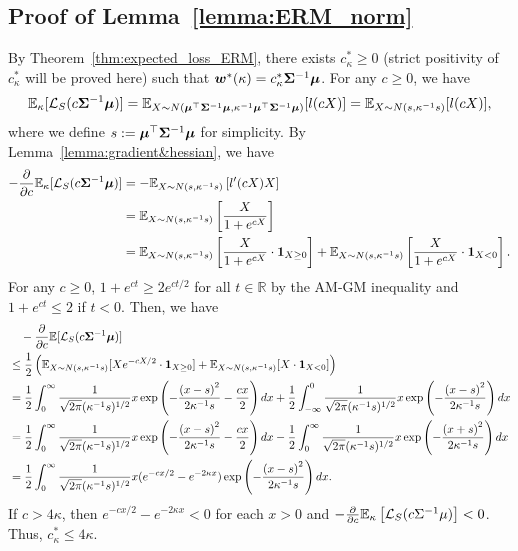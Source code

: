 \subsection{Proof of Lemma~\ref{lemma:ERM_norm}}\label{proof:lemma:ERM_norm}
By Theorem~\ref{thm:expected_loss_ERM}, there exists $c_\kappa^*\geq 0$ (strict positivity of $c_\kappa^*$ will be proved here) such that ${\bm{w}}^*(\kappa)= c_\kappa^* {\bm{\Sigma}}^{-1}{\bm{\mu}}$. For any $c\geq 0$, we have
\begin{equation*}
\mathbb{E}_\kappa[\mathcal{L}_S(c{\bm{\Sigma}}^{-1}{\bm{\mu}})] = \mathbb{E}_{X \sim N \left({\bm{\mu}}^\top {\bm{\Sigma}}^{-1} {\bm{\mu}}, \kappa^{-1} {\bm{\mu}}^\top {\bm{\Sigma}}^{-1} {\bm{\mu}} \right)}[l(c X)] = \mathbb{E}_{X \sim N \left(s, \kappa^{-1} s\right)}[l(c X)],
\end{equation*}
where we define $s:= {\bm{\mu}}^\top {\bm{\Sigma}}^{-1} {\bm{\mu}}$ for simplicity. By Lemma~\ref{lemma:gradient&hessian}, we have
\begin{align*}
    -\frac{\partial}{\partial c} \mathbb{E}_\kappa[\mathcal{L}_S(c{\bm{\Sigma}}^{-1}{\bm{\mu}})] 
    &= - \mathbb{E}_{X \sim N \left(s, \kappa^{-1} s \right)} \left[l'(cX)X \right]\\
    &= \mathbb{E}_{X \sim N \left(s, \kappa^{-1} s \right)} \left[\frac{X}{1+e^{cX}} \right]\\
    &= \mathbb{E}_{X \sim N \left(s, \kappa^{-1} s \right)} \left[\frac{X}{1+e^{cX}}\cdot {\bm{1}}_{X\geq0} \right]+\mathbb{E}_{X \sim N \left(s, \kappa^{-1}s \right)} \left[\frac{X}{1+e^{cX}} \cdot {\bm{1}}_{X<0}\right].
\end{align*}
For any $c\geq0$, $1+e^{ct} \geq 2e^{ct/2}$ for all $t \in \mathbb{R}$ by the AM-GM inequality and $1+e^{ct} \leq 2$ if $t<0$. Then, we have
\begin{align*}
    &\quad -\frac{\partial}{\partial c} \mathbb{E}[\mathcal{L}_S(c{\bm{\Sigma}}^{-1}{\bm{\mu}})]\\
    &\leq \frac{1}{2} \left (\mathbb{E}_{X \sim N \left(s, \kappa^{-1} s \right)}[X e^{-cX/2} \cdot {\bm{1}}_{X\geq 0}]+ \mathbb{E}_{X \sim N \left(s, \kappa^{-1} s\right)}[X \cdot {\bm{1}}_{X<0}]\right)\\
    &= \frac{1}{2} \int_0^\infty \frac{1}{\sqrt{2\pi}(\kappa^{-1} s)^{1/2}}x \exp\left(-\frac{\left(x-s \right)^2}{2\kappa^{-1} s}-\frac{cx}{2}\right)dx + \frac{1}{2} \int_{-\infty}^0  \frac{1}{\sqrt{2\pi}(\kappa^{-1} s)^{1/2}}x \exp \left(-\frac{\left(x-s\right)^2}{2\kappa^{-1} s}\right)dx\\
    &=\frac{1}{2} \int_0^\infty \frac{1}{\sqrt{2\pi}(\kappa^{-1} s)^{1/2}}x \exp\left(-\frac{\left(x-s \right)^2}{2\kappa^{-1} s}-\frac{cx}{2}\right)dx - \frac{1}{2} \int^\infty_0  \frac{1}{\sqrt{2\pi}(\kappa^{-1} s)^{1/2}}x \exp \left(-\frac{\left(x+s\right)^2}{2\kappa^{-1} s}\right)dx\\
    &= \frac{1}{2} \int_0^\infty \frac{1}{\sqrt{2\pi}(\kappa^{-1} s)^{1/2}}x (e^{-cx/2}-e^{-2\kappa x})\exp\left(-\frac{\left(x-s\right)^2}{2\kappa^{-1}s}\right) dx.
\end{align*}
If $c > 4\kappa$, then $e^{-cx/2}-e^{-2\kappa x}<0$ for each $x>0$ and $-\frac{\partial}{\partial c} \mathbb{E}_\kappa \left[ \mathcal{L}_S(c\Sigma^{-1}\mu) \right]<0$. Thus, $c_\kappa^* \leq 4\kappa$.

